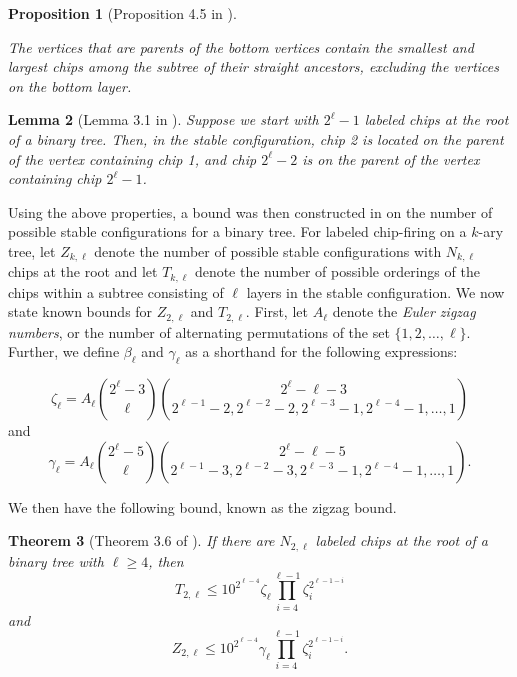 \documentclass[11pt]{article}
\newtheorem{theorem}{Theorem}[section]
\newtheorem{lemma}[theorem]{Lemma}
\newtheorem{prop}[theorem]{Proposition}
\theoremstyle{remark}
\theoremstyle{definition}
\begin{document}
\begin{prop}[Proposition 4.5 in \cite{MR4827886}]\label{4.5}

The vertices that are parents of the bottom vertices contain the smallest and largest chips among the subtree of their straight ancestors, excluding the vertices on the bottom layer.

\end{prop}

\begin{lemma}[Lemma 3.1 in \cite{inagaki2024chipfiringundirectedbinarytrees}]

Suppose we start with $2^\ell-1$ labeled chips at the root of a binary tree. Then, in the stable configuration, chip 2 is located on the parent of the vertex containing chip 1, and chip $2^\ell-2$ is on the parent of the vertex containing chip $2^\ell-1$.

\end{lemma}

Using the above properties, a bound was then constructed in \cite{inagaki2024chipfiringundirectedbinarytrees} on the number of possible stable configurations for a binary tree. For labeled chip-firing on a $k$-ary tree, let $Z_{k, \ell}$ denote the number of possible stable configurations with $N_{k, \ell}$ chips at the root and let $T_{k, \ell}$ denote the number of possible orderings of the chips within a subtree consisting of $\ell$ layers in the stable configuration. We now state known bounds for $Z_{2, \ell}$ and $T_{2, \ell}$. First, let $A_\ell$ denote the \textit{Euler zigzag numbers}, or the number of alternating permutations of the set $\{1,2,\ldots, \ell \}$. Further, we define $\beta_\ell$ and $\gamma_\ell$ as a shorthand for the following expressions:

$$\zeta_\ell = A_\ell \binom{2^\ell-3}{\ell} \binom{2^\ell-\ell-3}{2^{\ell-1}-2, 2^{\ell-2}-2, 2^{\ell-3}-1, 2^{\ell-4}-1, \ldots, 1}$$ and $$\gamma_\ell = A_\ell \binom{2^\ell-5}{\ell} \binom{2^\ell-\ell-5}{2^{\ell-1}-3, 2^{\ell-2}-3, 2^{\ell-3}-1, 2^{\ell-4}-1, \ldots, 1}.$$

We then have the following bound, known as the zigzag bound.

\begin{theorem}[Theorem 3.6 of \cite{inagaki2024chipfiringundirectedbinarytrees}]\label{thm:BinaryIKL} If there are $N_{2, \ell}$ labeled chips at the root of a binary tree with $\ell \ge 4$, then $$T_{2,\ell} \le 10^{2^{\ell-4}} \zeta_\ell \prod_{i=4}^{\ell-1} \zeta_i^{2^{\ell-1-i}}$$ and $$Z_{2, \ell} \le 10^{2^{\ell-4}} \gamma_\ell \prod_{i=4}^{\ell-1} \zeta_i^{2^{\ell-1-i}}.$$

\end{theorem}
\end{document}
